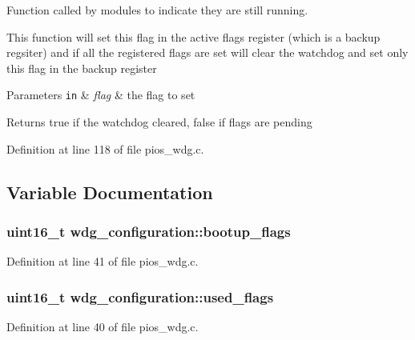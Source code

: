 \-Function called by modules to indicate they are still running. 

\-This function will set this flag in the active flags register (which is a backup regsiter) and if all the registered flags are set will clear the watchdog and set only this flag in the backup register


\begin{DoxyParams}[1]{\-Parameters}
\mbox{\tt in}  & {\em flag} & the flag to set \\
\hline
\end{DoxyParams}
\begin{DoxyReturn}{\-Returns}
true if the watchdog cleared, false if flags are pending 
\end{DoxyReturn}


\-Definition at line 118 of file pios\-\_\-wdg.\-c.



\subsection{\-Variable \-Documentation}
\hypertarget{group___p_i_o_s___w_d_g_ga52dc5a350735444a607b0dfd24d49371}{
\subsubsection[{bootup\-\_\-flags}]{\setlength{\rightskip}{0pt plus 5cm}uint16\-\_\-t wdg\-\_\-configuration\-::bootup\-\_\-flags}}\label{group___p_i_o_s___w_d_g_ga52dc5a350735444a607b0dfd24d49371}


\-Definition at line 41 of file pios\-\_\-wdg.\-c.

\hypertarget{group___p_i_o_s___w_d_g_ga5256cc27a9d0a00ca6392a56ff3426e0}{
\subsubsection[{used\-\_\-flags}]{\setlength{\rightskip}{0pt plus 5cm}uint16\-\_\-t wdg\-\_\-configuration\-::used\-\_\-flags}}\label{group___p_i_o_s___w_d_g_ga5256cc27a9d0a00ca6392a56ff3426e0}


\-Definition at line 40 of file pios\-\_\-wdg.\-c.

